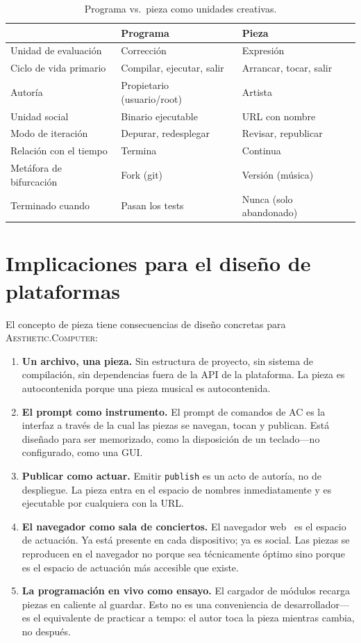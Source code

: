 \documentclass[10pt,letterpaper,twocolumn]{article}
\newcommand{\ac}{\textsc{Aesthetic.Computer}}
\begin{document}
\begin{table}[h]
\small
\centering
\begin{tabularx}{\columnwidth}{l X X}
\toprule
 & \textbf{Programa} & \textbf{Pieza} \\
\midrule
Unidad de evaluación & Corrección & Expresión \\
Ciclo de vida primario & Compilar, ejecutar, salir & Arrancar, tocar, salir \\
Autoría & Propietario (usuario/root) & Artista \\
Unidad social & Binario ejecutable & URL con nombre \\
Modo de iteración & Depurar, redesplegar & Revisar, republicar \\
Relación con el tiempo & Termina & Continua \\
Metáfora de bifurcación & Fork (git) & Versión (música) \\
Terminado cuando & Pasan los tests & Nunca (solo abandonado) \\
\bottomrule
\end{tabularx}
\caption{Programa vs.\ pieza como unidades creativas.}
\label{tab:comparison}
\end{table}

\section{Implicaciones para el diseño de plataformas}

El concepto de pieza tiene consecuencias de diseño concretas para \ac{}:

\begin{enumerate}
  \item \textbf{Un archivo, una pieza.} Sin estructura de proyecto, sin sistema de compilación, sin dependencias fuera de la API de la plataforma. La pieza es autocontenida porque una pieza musical es autocontenida.
  \item \textbf{El prompt como instrumento.} El prompt de comandos de AC es la interfaz a través de la cual las piezas se navegan, tocan y publican. Está diseñado para ser memorizado, como la disposición de un teclado---no configurado, como una GUI.
  \item \textbf{Publicar como actuar.} Emitir \texttt{publish} es un acto de autoría, no de despliegue. La pieza entra en el espacio de nombres inmediatamente y es ejecutable por cualquiera con la URL.
  \item \textbf{El navegador como sala de conciertos.} El navegador web~\citep{wyse2013viability} es el espacio de actuación. Ya está presente en cada dispositivo; ya es social. Las piezas se reproducen en el navegador no porque sea técnicamente óptimo sino porque es el espacio de actuación más accesible que existe.
  \item \textbf{La programación en vivo como ensayo.} El cargador de módulos recarga piezas en caliente al guardar. Esto no es una conveniencia de desarrollador---es el equivalente de practicar a tempo: el autor toca la pieza mientras cambia, no después.
\end{enumerate}
\end{document}
